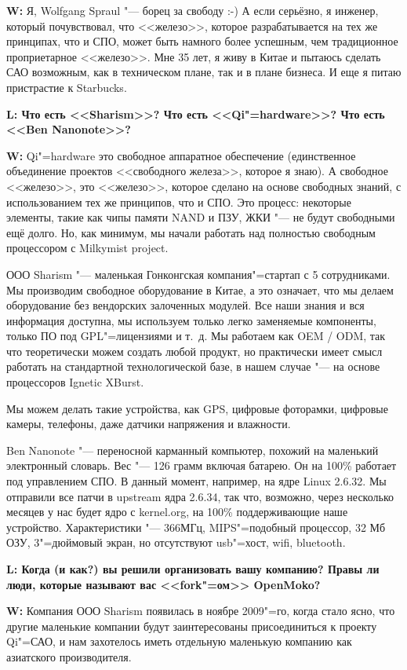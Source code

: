 \documentclass[10pt, a5paper]{article}
\begin{document}
{\noindent \bf W:} Я, Wolfgang Spraul "--- борец за свободу :-) А если серьёзно, я инженер, который почувствовал, что <<железо>>, которое разрабатывается на тех же принципах, что и СПО, может быть намного более успешным, чем традиционное проприетарное <<железо>>. Мне 35 лет, я живу в Китае и пытаюсь сделать САО возможным, как в техническом плане, так и в плане бизнеса. И еще я питаю пристрастие к Starbucks.

{\noindent \bf L: Что есть <<Sharism>>? Что есть <<Qi"=hardware>>? Что есть <<Ben Nanonote>>?}

{\noindent \bf W:} Qi"=hardware это свободное аппаратное обеспечение (единственное объединение проектов <<свободного железа>>, которое я знаю). А свободное <<железо>>, это <<железо>>, которое сделано на основе свободных знаний, с использованием тех же принципов, что и СПО. Это процесс: некоторые элементы, такие как чипы памяти NAND и ПЗУ, ЖКИ "--- не будут свободными ещё долго. Но, как минимум, мы начали работать над полностью свободным процессором с Milkymist project.

ООО Sharism "--- маленькая Гонконгская компания"=стартап с 5 сотрудниками. Мы производим свободное оборудование в Китае, а это означает, что мы делаем оборудование без вендорских залоченных модулей. Все наши знания и вся информация доступна, мы используем только легко заменяемые компоненты, только ПО под GPL"=лицензиями и т.~д. Мы работаем как OEM / ODM, так что теоретически можем создать любой продукт, но практически имеет смысл работать на стандартной технологической базе, в нашем случае "--- на основе процессоров Ignetic XBurst.

Мы можем делать такие устройства, как GPS, цифровые фоторамки, цифровые камеры, телефоны, даже датчики напряжения и влажности.

Ben Nanonote "--- переносной карманный компьютер, похожий на маленький электронный словарь. Вес "--- 126 грамм включая батарею. Он на 100\% работает под управлением СПО. В данный момент, например, на ядре Linux 2.6.32. Мы отправили все патчи в upstream ядра 2.6.34, так что, возможно, через несколько месяцев у нас будет ядро с kernel.org, на 100\% поддерживающие наше устройство. Характеристики "--- 366МГц, MIPS"=подобный процессор, 32 Мб ОЗУ, 3"=дюймовый экран, но отсутствуют usb"=хост, wifi, bluetooth.

{\noindent \bf L: Когда (и как?) вы решили организовать вашу компанию? Правы ли люди, которые называют вас <<fork"=ом>> OpenMoko?}

{\noindent \bf W:} Компания ООО Sharism появилась в ноябре 2009"=го, когда стало ясно, что другие маленькие компании будут заинтересованы присоединиться к проекту Qi"=САО, и нам захотелось иметь отдельную маленькую компанию как азиатского производителя.
\end{document}
